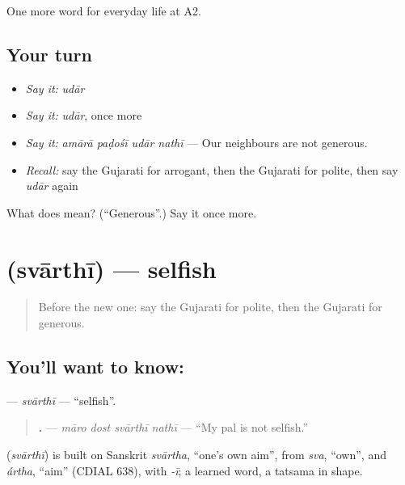 \begin{grammarlens}[title={What you've built}]
One more word for everyday life at A2.
\end{grammarlens}

\subsection*{Your turn}
\begin{itemize}
\raggedright
  \item \emph{Say it:} \emph{udār}
  \item \emph{Say it:} \emph{udār}, once more
  \item \emph{Say it:} \emph{amārā paḍośī udār nathī} — Our neighbours are not generous.
  \item \emph{Recall:} say the Gujarati for arrogant, then the Gujarati for polite, then say \emph{udār} again
\end{itemize}

\begin{tcolorbox}[breakable,colback=teal!4,colframe=teal!35!black,title={Before you move on}]
What does  mean? (\textquotedblleft{}Generous\textquotedblright{}.) Say it once more.
\end{tcolorbox}
\section[\texorpdfstring{\gu{સ્વાર્થી} (svārthī)}{સ્વાર્થી (svārthī)}]{ (svārthī) — selfish}

\label{lesson:GU-C271-svarthi}



\begin{quote}
Before the new one: say the Gujarati for polite, then the Gujarati for generous.
\end{quote}

\subsection*{You'll want to know: }
\textbf{} — \emph{svārthī} — \textquotedblleft{}selfish\textquotedblright{}.

\begin{quote}
\textbf{   .} — \emph{māro dost svārthī nathī} — \textquotedblleft{}My pal is not selfish.\textquotedblright{}
\end{quote}

\begin{cousinweb}
\textbf{} (\emph{svārthī}) is built on Sanskrit \emph{svārtha}, \textquotedblleft{}one's own aim\textquotedblright{}, from \emph{sva}, \textquotedblleft{}own\textquotedblright{}, and \emph{ártha}, \textquotedblleft{}aim\textquotedblright{} (CDIAL 638), with \emph{-ī}; a learned word, a tatsama in shape.
\end{cousinweb}

